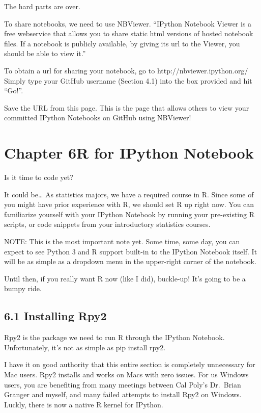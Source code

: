 \documentclass{article}
\begin{document}
    The hard parts are over.

To share notebooks, we need to use NBViewer. ``IPython Notebook Viewer
is a free webservice that allows you to share static html versions of
hosted notebook files. If a notebook is publicly available, by giving
its url to the Viewer, you should be able to view it.''

To obtain a url for sharing your notebook, go to
http://nbviewer.ipython.org/ Simply type your GitHub username (Section
4.1) into the box provided and hit ``Go!''.

Save the URL from this page. This is the page that allows others to view
your committed IPython Notebooks on GitHub using NBViewer!

 


    \section{Chapter 6R for IPython Notebook}


    Is it time to code yet?

It could be\ldots{} As statistics majors, we have a required course in
R. Since some of you might have prior experience with R, we should set R
up right now. You can familiarize yourself with your IPython Notebook by
running your pre-existing R scripts, or code snippets from your
introductory statistics courses.

NOTE: This is the most important note yet. Some time, some day, you can
expect to see Python 3 and R support built-in to the IPython Notebook
itself. It will be as simple as a dropdown menu in the upper-right
corner of the notebook.

Until then, if you really want R now (like I did), buckle-up! It's going
to be a bumpy ride.


    \subsection{6.1 Installing Rpy2}


    Rpy2 is the package we need to run R through the IPython Notebook.
Unfortunately, it's not as simple as pip install rpy2.

I have it on good authority that this entire section is completely
unnecessary for Mac users. Rpy2 installs and works on Macs with zero
issues. For us Windows users, you are benefiting from many meetings
between Cal Poly's Dr.~Brian Granger and myself, and many failed
attempts to install Rpy2 on Windows. Luckly, there is now a native R
kernel for IPython.
\end{document}
